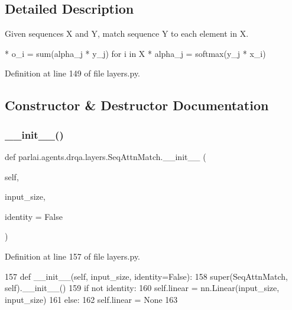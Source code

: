 \subsection{Detailed Description}
\begin{DoxyVerb}Given sequences X and Y, match sequence Y to each element in X.

* o_i = sum(alpha_j * y_j) for i in X
* alpha_j = softmax(y_j * x_i)
\end{DoxyVerb}
 

Definition at line 149 of file layers.\+py.



\subsection{Constructor \& Destructor Documentation}
\mbox{\label{classparlai_1_1agents_1_1drqa_1_1layers_1_1SeqAttnMatch_abd3be7cddadf751a880aab03c55b0a6c}} 
\subsubsection{\texorpdfstring{\+\_\+\+\_\+init\+\_\+\+\_\+()}{\_\_init\_\_()}}
{\footnotesize\ttfamily def parlai.\+agents.\+drqa.\+layers.\+Seq\+Attn\+Match.\+\_\+\+\_\+init\+\_\+\+\_\+ (\begin{DoxyParamCaption}\item[{}]{self,  }\item[{}]{input\+\_\+size,  }\item[{}]{identity = {\ttfamily False} }\end{DoxyParamCaption})}



Definition at line 157 of file layers.\+py.


\begin{DoxyCode}
157     \textcolor{keyword}{def }\_\_init\_\_(self, input\_size, identity=False):
158         super(SeqAttnMatch, self).\_\_init\_\_()
159         \textcolor{keywordflow}{if} \textcolor{keywordflow}{not} identity:
160             self.linear = nn.Linear(input\_size, input\_size)
161         \textcolor{keywordflow}{else}:
162             self.linear = \textcolor{keywordtype}{None}
163 
\end{DoxyCode}


